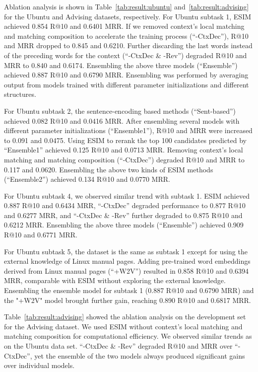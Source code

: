 \documentclass[letterpaper]{article} \usepackage{aaai19}  \usepackage{times}  \usepackage{helvet}  \usepackage{courier}  \usepackage{url}  \usepackage{graphicx}
\begin{document}
Ablation analysis is shown in Table~\ref{tab:result:ubuntu} and~\ref{tab:result:advising} for the Ubuntu and Advising datasets, respectively. For Ubuntu subtask 1, ESIM achieved 0.854 R@10 and 0.6401 MRR. If we removed context's local matching and matching composition to accelerate the training process (``-CtxDec''), R@10 and MRR dropped to 0.845 and 0.6210. Further discarding the last words instead of the preceding words for the context (``-CtxDec \& -Rev'') degraded R@10 and MRR to 0.840 and 0.6174. Ensembling the above three models (``Ensemble'') achieved 0.887 R@10 and 0.6790 MRR. Ensembling was performed by averaging output from models trained with different parameter initializations and different structures. 

For Ubuntu subtask 2, the sentence-encoding based methods (``Sent-based'') achieved 0.082 R@10 and 0.0416 MRR. After ensembling several models with different parameter initializations (``Ensemble1''), R@10 and MRR were increased to 0.091 and 0.0475. Using ESIM to rerank the top 100 candidates predicted by ``Ensemble1'' achieved 0.125 R@10 and 0.0713 MRR. Removing context's local matching and matching composition (``-CtxDec'') degraded R@10 and MRR to 0.117 and 0.0620. Ensembling the above two kinds of ESIM methods (``Ensemble2'') achieved 0.134 R@10 and 0.0770 MRR.

For Ubuntu subtask 4, we observed similar trend with subtask 1. ESIM achieved 0.887 R@10 and 0.6434 MRR, ``-CtxDec'' degraded performance to 0.877 R@10 and 0.6277 MRR, and ``-CtxDec \& -Rev'' further degraded to 0.875 R@10 and 0.6212 MRR. Ensembling the above three models (``Ensemble'') achieved 0.909 R@10 and 0.6771 MRR. 

For Ubuntu subtask 5, the dataset is the same as subtask 1 except for using the external knowledge of Linux manual pages. Adding pre-trained word embeddings derived from Linux manual pages (``+W2V'') resulted in 0.858 R@10 and 0.6394 MRR, comparable with ESIM without exploring the external knowledge. Ensembling the ensemble model for subtask 1 (0.887 R@10 and 0.6790 MRR) and the "+W2V" model brought further gain, reaching 0.890 R@10 and 0.6817 MRR.

 Table~\ref{tab:result:advising} showed the ablation analysis on the development set for the Advising dataset. We used ESIM without context's local matching and matching composition for computational efficiency. We observed similar trends as on the Ubuntu data set. ``-CtxDec \& -Rev'' degraded R@10 and MRR over ``-CtxDec'', yet the ensemble of the two models always produced significant gains over individual models.
\end{document}
